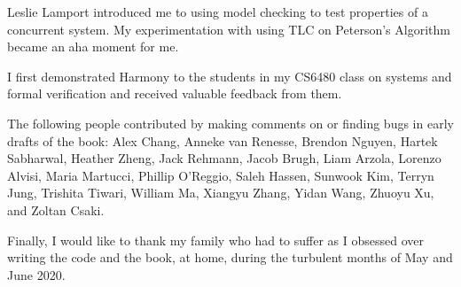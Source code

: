 \documentclass{report}
\begin{document}
Leslie Lamport introduced me to using model checking to test properties
of a concurrent system.  My experimentation with using TLC on Peterson's
Algorithm became an aha moment for me.

I first demonstrated Harmony to the students in my CS6480 class on systems
and formal verification and
received valuable feedback from them.

The following people contributed by making comments on or finding bugs in
early drafts of the book:
Alex Chang,
Anneke van Renesse,
Brendon Nguyen,
Hartek Sabharwal,
Heather Zheng,
Jack Rehmann,
Jacob Brugh,
Liam Arzola,
Lorenzo Alvisi,
Maria Martucci,
Phillip O'Reggio,
Saleh Hassen,
Sunwook Kim,
Terryn Jung,
Trishita Tiwari,
William Ma,
Xiangyu Zhang,
Yidan Wang,
Zhuoyu Xu,
and
Zoltan Csaki.

Finally, I would like to thank my family who had to suffer as I obsessed
over writing the code and the book, at home, during the turbulent months of
May and June 2020.


\cleardoublepage
{}
\printindex

\cleardoublepage
{}
\printglossaries
\end{document}
